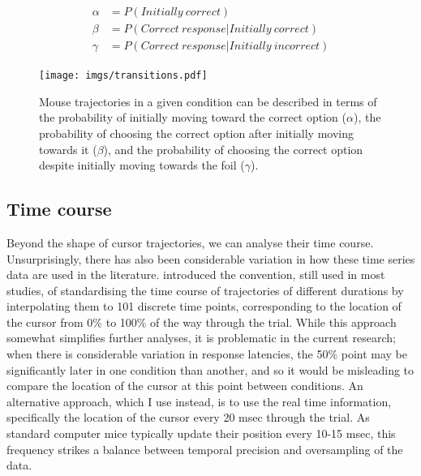 \begin{equation}
  \label{eq:transitions}
  \begin{split}
    \alpha &= P(Initially\ correct)\\
    \beta  &= P(Correct\ response | Initially\ correct)\\
    \gamma &= P(Correct\ response | Initially\ incorrect)
  \end{split}
\end{equation}


\begin{figure}[ht]
  \centering
  \texttt{[image: imgs/transitions.pdf]}
  \caption[Parameters for descriptions cursor transitions.]{
    \label{fig:trajectory-types}
    Mouse trajectories in a given condition can be described in terms of
    the probability of initially moving toward the correct option ($\alpha$),
    the probability of choosing the correct option
    after initially moving towards it ($\beta$),
    and the probability of choosing the correct option
    despite initially moving towards the foil ($\gamma$).
  }
\end{figure}








\subsection{Time course}

Beyond the shape of cursor trajectories,
we can analyse their time course.
Unsurprisingly, there has also been considerable variation
in how these time series data are used in the literature.
\citet{Spivey2005} introduced the convention, 
still used in most studies,
of standardising the time course of trajectories of different durations
by interpolating them to 101 discrete time points,
corresponding to the location of the cursor 
from 0\% to 100\% of the way through the trial.
While this approach somewhat simplifies further analyses,
it is problematic in the current research;
when there is considerable variation in response latencies,
the 50\% point may be significantly later in one condition than another,
and so it would be misleading to compare
the location of the cursor at this point between conditions.
An alternative approach, which I use instead,
is to use the real time information,
specifically the location of the cursor every 20 msec through the trial.
As standard computer mice typically update their position
every 10-15 msec, this frequency strikes a balance between
temporal precision and oversampling of the data.

